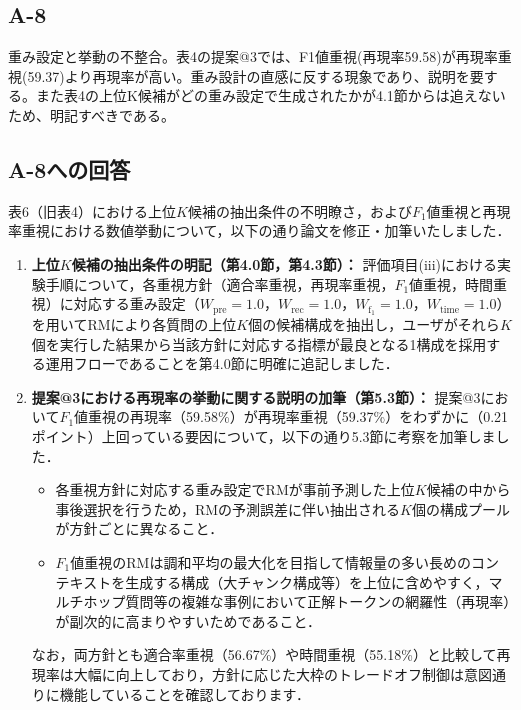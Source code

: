 \documentclass{jsarticle}
\begin{document}
\subsection*{A-8}
\begin{screen}
重み設定と挙動の不整合。表4の提案@3では、F1値重視(再現率59.58)が再現率重視(59.37)より再現率が高い。重み設計の直感に反する現象であり、説明を要する。また表4の上位K候補がどの重み設定で生成されたかが4.1節からは追えないため、明記すべきである。
\end{screen}

\subsection*{A-8への回答}
表6（旧表4）における上位$K$候補の抽出条件の不明瞭さ，および$F_1$値重視と再現率重視における数値挙動について，以下の通り論文を修正・加筆いたしました．

\begin{enumerate}
\item \textbf{上位$K$候補の抽出条件の明記（第4.0節，第4.3節）：}
評価項目(iii)における実験手順について，各重視方針（適合率重視，再現率重視，$F_1$値重視，時間重視）に対応する重み設定（$W_{\mathrm{pre}}=1.0$，$W_{\mathrm{rec}}=1.0$，$W_{\mathrm{f_1}}=1.0$，$W_{\mathrm{time}}=1.0$）を用いてRMにより各質問の上位$K$個の候補構成を抽出し，ユーザがそれら$K$個を実行した結果から当該方針に対応する指標が最良となる1構成を採用する運用フローであることを第4.0節に明確に追記しました．

\item \textbf{提案@3における再現率の挙動に関する説明の加筆（第5.3節）：}
提案@3において$F_1$値重視の再現率（59.58\%）が再現率重視（59.37\%）をわずかに（0.21ポイント）上回っている要因について，以下の通り5.3節に考察を加筆しました．
\begin{itemize}
\item 各重視方針に対応する重み設定でRMが事前予測した上位$K$候補の中から事後選択を行うため，RMの予測誤差に伴い抽出される$K$個の構成プールが方針ごとに異なること．
\item $F_1$値重視のRMは調和平均の最大化を目指して情報量の多い長めのコンテキストを生成する構成（大チャンク構成等）を上位に含めやすく，マルチホップ質問等の複雑な事例において正解トークンの網羅性（再現率）が副次的に高まりやすいためであること．
\end{itemize}
なお，両方針とも適合率重視（56.67\%）や時間重視（55.18\%）と比較して再現率は大幅に向上しており，方針に応じた大枠のトレードオフ制御は意図通りに機能していることを確認しております．
\end{enumerate}
\end{document}
